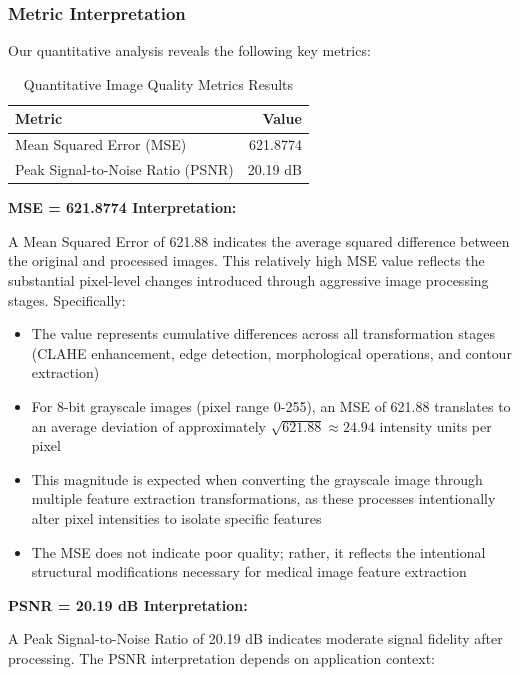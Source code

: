 \documentclass[12pt,a4paper]{article}
\begin{document}
\subsubsection*{Metric Interpretation}

Our quantitative analysis reveals the following key metrics:

\begin{table}[H]
    \centering
    \begin{tabular}{|l|r|}
    \hline
    \textbf{Metric} & \textbf{Value} \\
    \hline
    Mean Squared Error (MSE) & 621.8774 \\
    Peak Signal-to-Noise Ratio (PSNR) & 20.19 dB \\
    \hline
    \end{tabular}
    \caption{Quantitative Image Quality Metrics Results}
\end{table}

\textbf{MSE = 621.8774 Interpretation:}

A Mean Squared Error of 621.88 indicates the average squared difference between the original and processed images. This relatively high MSE value reflects the substantial pixel-level changes introduced through aggressive image processing stages. Specifically:

\begin{itemize}
    \item The value represents cumulative differences across all transformation stages (CLAHE enhancement, edge detection, morphological operations, and contour extraction)
    \item For 8-bit grayscale images (pixel range 0-255), an MSE of 621.88 translates to an average deviation of approximately $\sqrt{621.88} \approx 24.94$ intensity units per pixel
    \item This magnitude is expected when converting the grayscale image through multiple feature extraction transformations, as these processes intentionally alter pixel intensities to isolate specific features
    \item The MSE does not indicate poor quality; rather, it reflects the intentional structural modifications necessary for medical image feature extraction
\end{itemize}

\textbf{PSNR = 20.19 dB Interpretation:}

A Peak Signal-to-Noise Ratio of 20.19 dB indicates moderate signal fidelity after processing. The PSNR interpretation depends on application context:
\end{document}
